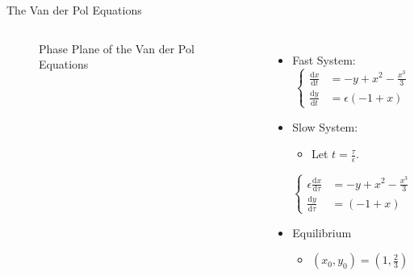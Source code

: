 \documentclass[11pt]{beamer}
\newcommand{\dif}{\mathrm{d}}
\begin{document}
\begin{frame}{The Van der Pol Equations}
\begin{columns} 
\begin{figure}
    \centering
{}
    \caption{Phase Plane of the Van der Pol Equations}
\end{figure}


\begin{itemize}
    \item Fast System:
    \begin{equation*} 
        \begin{cases}
        \frac{\dif x}{\dif t}&= -y + x^2 - \frac{x^3}{3}\\
        \frac{\dif y}{\dif t}&=\epsilon (-1+x)
        \end{cases}
        \end{equation*}
\pause
\item Slow System:\\
     \begin{itemize}\item Let $t=\frac{\tau}{\epsilon}$.\end{itemize}
\begin{equation*} 
        \begin{cases}
        \epsilon\frac{\dif x}{\dif \tau} &= -y + x^2 - \frac{x^3}{3}\\ 
        \frac{\dif y}{\dif \tau}&= (-1+x)
        \end{cases}
        \end{equation*}
\newline
\item Equilibrium 
\begin{itemize}
\item $(x_0,y_0)=(1,\frac{2}{3}) $
\end{itemize}
\end{itemize}
\end{columns}
\end{frame}
\end{document}

